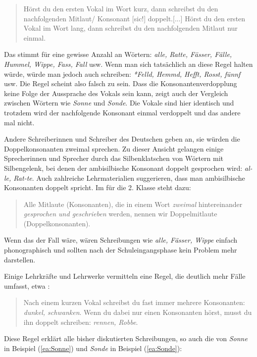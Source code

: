 \begin{quote}
Hörst du den ersten Vokal im Wort kurz, dann schreibst du den nachfolgenden Mitlaut/ Konsonant [sic!] doppelt.[...] Hörst du den ersten Vokal im Wort lang, dann schreibst du den nachfolgenden Mitlaut nur einmal.
\end{quote}

Das stimmt für eine gewisse Anzahl an Wörtern: \textit{alle, Ratte, Fässer, Fälle, Hummel, Wippe, Fass, Fall} usw. Wenn man sich tatsächlich an diese Regel halten würde, würde man jedoch auch schreiben: \textit{*Felld, Hemmd, Hefft, Rosst, fünnf} usw. Die Regel scheint also falsch zu sein. Dass die Konsonantenverdopplung keine Folge der Aussprache des Vokals sein kann, zeigt auch der Vergleich zwischen Wörtern wie \textit{Sonne} und \textit{Sonde}. Die Vokale sind hier identisch und trotzdem wird der nachfolgende Konsonant einmal verdoppelt und das andere mal nicht. 

Andere Schreiberinnen und Schreiber des Deutschen geben an, sie würden die Doppelkonsonanten zweimal sprechen. Zu dieser Ansicht gelangen einige Sprecherinnen und Sprecher durch das Silbenklatschen von Wörtern mit Silbengelenk, bei denen der ambisilbische Konsonant doppelt gesprochen wird: \textit{al-le, Rat-te}. Auch zahlreiche Lehrmaterialien suggerieren, dass man ambisilbische Konsonanten doppelt spricht. Im  für die 2. Klasse \citep[AB 3.1.]{Dammeyer2010} steht dazu:

\begin{quote}
    Alle Mitlaute (Konsonanten), die in einem Wort \textit{zweimal} hintereinander \textit{gesprochen und geschrieben} werden, nennen wir Doppelmitlaute (Doppelkonsonanten).
\end{quote}

Wenn das der Fall wäre, wären Schreibungen wie \textit{alle, Fässer, Wippe} einfach phonographisch und sollten nach der Schuleingangsphase kein Problem mehr darstellen.

Einige Lehrkräfte und Lehrwerke vermitteln eine Regel, die deutlich mehr Fälle umfasst, etwa \citet[8]{MaierUsemann2015}:

\begin{quote}
Nach einem kurzen Vokal schreibst du fast immer mehrere Konsonanten: \textit{dunkel, schwanken}.
Wenn du dabei nur einen Konsonanten hörst, musst du ihn doppelt schreiben: \textit{rennen, Robbe}.
\end{quote}

Diese Regel erklärt alle bisher diskutierten Schreibungen, so auch die von \textit{Sonne} in Beispiel (\ref{ea:Sonne}) und \textit{Sonde} in Beispiel (\ref{ea:Sonde}):

